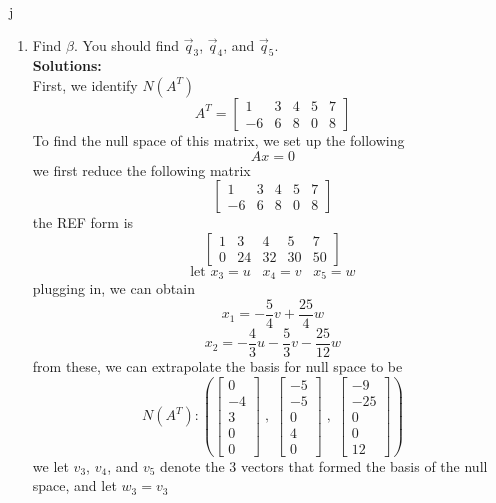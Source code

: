 j\documentclass[12pt]{article}
\begin{document}
\begin{enumerate}
\begin{enumerate}
        
  
		\item  Find $\beta$. You should find $\vec q_3$, $\vec q_4$, and $\vec q_5$. \\
        \textbf{Solutions:}\\
        First, we identify $N(A^T)$
        \[
        A^T=
        \begin{bmatrix}
            1&3&4&5&7\\
            -6&6&8&0&8
        \end{bmatrix}
        \]
        To find the null space of this matrix, we set up the following
        \[
        Ax=0
        \]
        we first reduce the following matrix
        \[
        \begin{bmatrix}
            1&3&4&5&7\\
            -6&6&8&0&8
        \end{bmatrix}
        \]
        the REF form is
        \[
        \begin{bmatrix}
            1 & 3 & 4 & 5 & 7 \\
            0 & 24 & 32 & 30 & 50
        \end{bmatrix}
        \]
        \[
        \text{let }x_3=u \;\;\; x_4=v \;\;\; x_5=w
        \]
        plugging in, we can obtain
        \[
        x_1=-\frac{5}{4}v+\frac{25}{4}w
        \]
        \[
        x_2=-\frac{4}{3}u-\frac{5}{3}v-\frac{25}{12}w
        \]
        from these, we can extrapolate the basis for null space to be
        \[
        N(A^T): \left(
        \begin{bmatrix}
            0\\ -4\\3\\0\\0
        \end{bmatrix}
        \;,\;
        \begin{bmatrix}
            -5\\ -5\\ 0\\4\\0
        \end{bmatrix}
        \;,\;
        \begin{bmatrix}
            -9\\ -25\\0\\0\\12
        \end{bmatrix}
        \right)
        \]
        we let $v_3$, $v_4$, and $v_5$ denote the 3 vectors that formed the basis of the null space, and let $w_3=v_3$

\end{enumerate}
\end{enumerate}
\end{document}

